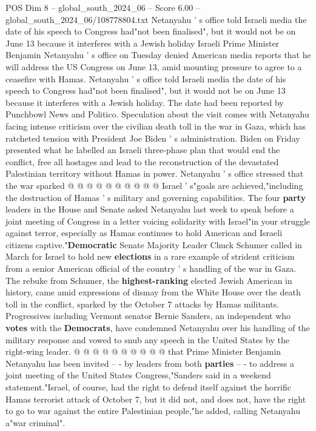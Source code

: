 \begin{textsample}{POS Dim 8 – global\_south\_2024\_06 – Score 6.00 – global\_south\_2024\_06/108778804.txt}  \label{ex:f8_pos_212}
Netanyahu ' s office told Israeli media the date of his speech to Congress had"not been finalised", but it would not be on June 13 because it interferes with a Jewish holiday Israeli Prime Minister Benjamin Netanyahu ' s office on Tuesday denied American media reports that he will address the US Congress on June 13, amid mounting pressure to agree to a ceasefire with Hamas.
Netanyahu ' s office told Israeli media the date of his speech to Congress had"not been finalised", but it would not be on June 13 because it interferes with a Jewish holiday.
The date had been reported by Punchbowl News and Politico.
Speculation about the visit comes with Netanyahu facing intense criticism over the civilian death toll in the war in Gaza, which has ratcheted tension with President Joe Biden ' s administration.
Biden on Friday presented what he labelled an Israeli three-phase plan that would end the conflict, free all hostages and lead to the reconstruction of the devastated Palestinian territory without Hamas in power.
Netanyahu ' s office stressed that the war sparked @ @ @ @ @ @ @ @ @ @ Israel ' s"goals are achieved,"including the destruction of Hamas ' s military and governing capabilities.
The four \textbf{party} leaders in the House and Senate asked Netanyahu last week to speak before a joint meeting of Congress in a letter voicing solidarity with Israel"in your struggle against terror, especially as Hamas continues to hold American and Israeli citizens captive."\textbf{Democratic} Senate Majority Leader Chuck Schumer called in March for Israel to hold new \textbf{elections} in a rare example of strident criticism from a senior American official of the country ' s handling of the war in Gaza.
The rebuke from Schumer, the \textbf{highest-ranking} elected Jewish American in history, came amid expressions of dismay from the White House over the death toll in the conflict, sparked by the October 7 attacks by Hamas militants.
Progressives including Vermont senator Bernie Sanders, an independent who \textbf{votes} with the \textbf{Democrats}, have condemned Netanyahu over his handling of the military response and vowed to snub any speech in the United States by the right-wing leader. @ @ @ @ @ @ @ @ @ @ that Prime Minister Benjamin Netanyahu has been invited -- - by leaders from both \textbf{parties} -- - to address a joint meeting of the United States Congress,"Sanders said in a weekend statement."Israel, of course, had the right to defend itself against the horrific Hamas terrorist attack of October 7, but it did not, and does not, have the right to go to war against the entire Palestinian people,"he added, calling Netanyahu a"war criminal".

\end{textsample}
